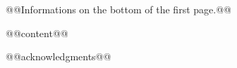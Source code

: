 \documentclass[prodmode,acmtap]{acmtog}
\author{￼@@author 1@@
\affil{@@affiliation@@￼}
\and
￼@@autho 2r@@
\affil{￼@@affiliation@@}
}
\begin{document}
\begin{bottomstuff}
@@Informations on the bottom of the first page.@@
\end{bottomstuff}

\maketitle

@@content@@

\begin{acks}
@@acknowledgments@@
\end{acks}



\end{document}
